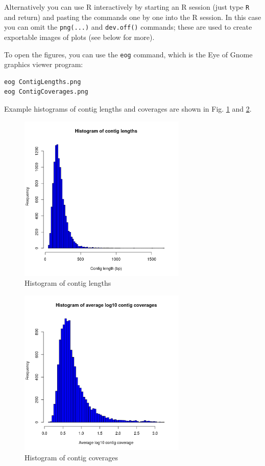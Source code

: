 \documentclass[11pt]{article}
\begin{document}
Alternatively you can use R interactively by starting an R session
(just type \texttt{R} and return) and pasting the commands one by one into the
R session. In this case you can omit the \texttt{png(...)} and \texttt{dev.off()} commands;
these are used to create exportable images of plots (see below for more).

To open the figures, you can use the \texttt{eog} command, which is the
Eye of Gnome graphics viewer program:

\begin{verbatim}
eog ContigLengths.png
eog ContigCoverages.png
\end{verbatim}


Example histograms of contig lengths and coverages are shown in
Fig. \ref{fig:histcontlength} and \ref{fig:histcontcov}.


\begin{figure}[htb]
\centering
\includegraphics[width=8cm]{ContigLengths.png}
\caption{\label{fig:histcontlength}Histogram of contig lengths}
\end{figure}


\begin{figure}[htb]
\centering
\includegraphics[width=8cm]{ContigCoverages.png}
\caption{\label{fig:histcontcov}Histogram of contig coverages}
\end{figure}
\end{document}
